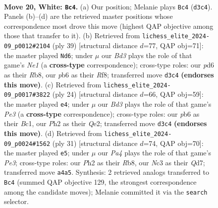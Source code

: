 \documentclass[11pt]{article}
\begin{document}
\clearpage

\begin{figure}[p]\centering
\begin{subfigure}{0.46\textwidth}\centering
\resizebox{\linewidth}{!}{%
\newchessgame
\chessboard[
  setfen={1nb1r1k1/r3qpp1/1p1p1n2/4p2p/P3P3/2NB1NP1/2PQ1P1P/R1R3K1 w - - 1 20},
  showmover=false,
  pgfstyle=straightmove, color=movearrow, markmove={d3-c4}
]}
\caption{}
\end{subfigure}\hfill
\begin{subfigure}{0.46\textwidth}\centering
\resizebox{\linewidth}{!}{%
\newchessgame
\chessboard[
  setfen={1r2nrk1/1p1nqppp/6b1/N2Pp3/1p2P1P1/3B1N1P/PP2QP2/2R2RK1 b - - 0 20},
  showmover=false,
  pgfstyle=straightmove, color=movearrow, markmove={e8-d6}
]}
\caption{}
\end{subfigure}
\\[4pt]
\begin{subfigure}{0.46\textwidth}\centering
\resizebox{\linewidth}{!}{%
\newchessgame
\chessboard[
  setfen={r2q1rk1/6pp/2nbpn2/2pp4/8/2N1PN2/PP2QPPP/R1B2RK1 w - - 1 13},
  showmover=false,
  pgfstyle=straightmove, color=movearrow, markmove={e3-e4}
]}
\caption{}
\end{subfigure}\hfill
\begin{subfigure}{0.46\textwidth}\centering
\resizebox{\linewidth}{!}{%
\newchessgame
\chessboard[
  setfen={1r2r1k1/1p1q1ppp/p1n1pn2/3p4/P2P4/2PB1NP1/1P3PP1/R2QR1K1 b - - 2 16},
  showmover=false,
  pgfstyle=straightmove, color=movearrow, markmove={e6-e5}
]}
\caption{}
\end{subfigure}
\caption{\textbf{Move 20, White: \texttt{Bc4}.} (a) Our position; Melanie plays \texttt{Bc4} (\texttt{d3c4}). Panels (b)--(d) are the retrieved master positions whose correspondence most drove this move (highest QAP objective among those that transfer to it). (b) Retrieved from \texttt{lichess\_elite\_2024-09\_p0012\#2104} (ply 39) [structural distance $d$=77, QAP obj=71]: the master played \texttt{Nd6}; under $\mu$ our \emph{Bd3} plays the role of that game's \emph{Ne1} (a \textbf{cross-type} correspondence); cross-type roles: our \emph{p}d6 as their \emph{R}b8, our \emph{p}b6 as their \emph{R}f8; transferred move \texttt{d3c4} \textbf{(endorses this move)}. (c) Retrieved from \texttt{lichess\_elite\_2024-09\_p0017\#3822} (ply 24) [structural distance $d$=66, QAP obj=59]: the master played \texttt{e4}; under $\mu$ our \emph{Bd3} plays the role of that game's \emph{Pe3} (a \textbf{cross-type} correspondence); cross-type roles: our \emph{p}b6 as their \emph{B}c1, our \emph{P}h2 as their \emph{Q}e2; transferred move \texttt{d3c4} \textbf{(endorses this move)}. (d) Retrieved from \texttt{lichess\_elite\_2024-09\_p0024\#1562} (ply 31) [structural distance $d$=74, QAP obj=70]: the master played \texttt{e5}; under $\mu$ our \emph{Pa4} plays the role of that game's \emph{Pe3}; cross-type roles: our \emph{P}h2 as their \emph{R}b8, our \emph{N}c3 as their \emph{Q}d7; transferred move \texttt{a4a5}. Synthesis: 2 retrieved analogs transferred to \texttt{Bc4} (summed QAP objective 129, the strongest correspondence among the candidate moves); Melanie committed it via the \texttt{search} selector.}
\label{fig:thought-m38}
\end{figure}
\end{document}
